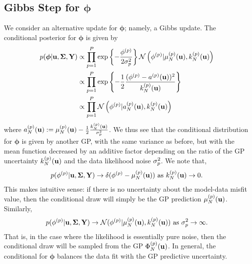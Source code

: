 \documentclass[12pt]{article}
\newcommand{\bphi}{\boldsymbol{\phi}}
\begin{document}
\subsection{Gibbs Step for $\bphi$}
We consider an alternative update for $\bphi$; namely, a Gibbs update. The conditional posterior for $\bphi$ is given by 
\begin{align*}
p(\bphi | \bpar, \CovObs, \stateMat) 
&\propto \prod_{\objIdx=1}^{\Nobj} \exp\left\{-\frac{\indexObj{\phi}}{2\sdObs^2_{\objIdx}} \right\} 
	\Gaussian\left(\indexObj{\phi} | \GPMeanPredOut{\Ndesign}{\objIdx}(\bpar), \GPKerPredOut{\Ndesign}{\objIdx}(\bpar)\right) \\
&\propto \prod_{\objIdx=1}^{\Nobj} \exp\left\{-\frac{1}{2} \frac{(\indexObj{\phi} - \indexObj{a}(\bpar))^2}{\GPKerPredOut{\Ndesign}{\objIdx}(\bpar)} \right\} \\
&\propto \prod_{\objIdx=1}^{\Nobj} \Gaussian\left(\indexObj{\phi} | \indexObj{a}_{\Ndesign}(\bpar), \GPKerPredOut{\Ndesign}{\objIdx}(\bpar)\right)
\end{align*}
where ${a}^{(p)}_{N}(\mathbf{u}) := \mu_{N}^{(p)}(\mathbf{u}) - \frac{1}{2}\frac{k_{N}^{(p)}(\mathbf{u})}{\sigma^2_{p}}$. We thus see that 
the conditional distribution for $\bphi$ is given by another GP, with the same variance as before, but with the mean function decreased by an additive factor depending on the 
ratio of the GP uncertainty $k_{N}^{(p)}(\mathbf{u})$ and the data likelihood noise $\sigma^2_{p}$. We note that, 
\begin{align*}
p({\phi}^{(p)} | \mathbf{u}, \boldsymbol{\Sigma}, \mathbf{Y}) \to \delta({\phi}^{(p)} - \mu_{N}^{(p)}(\mathbf{u})) \text{ as } k_{N}^{(p)}(\mathbf{u}) \to 0.
\end{align*}
This makes intuitive sense: if there is no uncertainty about the model-data misfit value, then the conditional draw will simply be the GP prediction $\mu_{N}^{(p)}(\mathbf{u})$.
Similarly, 
\begin{align*}
p({\phi}^{(p)} | \mathbf{u}, \boldsymbol{\Sigma}, \mathbf{Y}) \to \mathcal{N}({\phi}^{(p)}|\mu_{N}^{(p)}(\mathbf{u}) , k_{N}^{(p)}(\mathbf{u})) \text{ as } \sigma^2_{p} \to \infty.
\end{align*}
That is, in the case where the likelihood is essentially pure noise, then the conditional draw will be sampled from the GP $\Phi_{N}^{(p)}(\mathbf{u})$. In general, the 
conditional for $\bphi$ balances the data fit with the GP predictive uncertainty.
\end{document}
